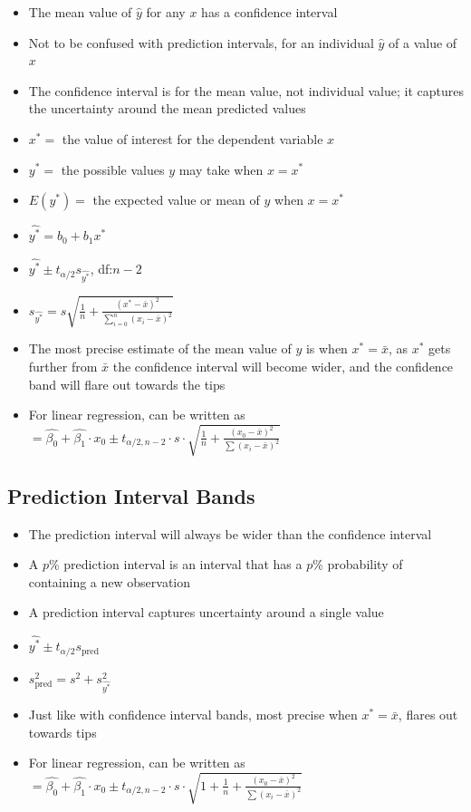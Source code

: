 \documentclass{article}
\begin{document}
\begin{itemize}
    \item The mean value of $\hat{y}$ for any $x$ has a confidence interval
    \item Not to be confused with prediction intervals, for an individual $\hat{y}$ of a value of $x$
    \item The confidence interval is for the mean value, not individual value; it captures the uncertainty around the mean predicted values
    \item $x^*=$ the value of interest for the dependent variable $x$
    \item $y^*=$ the possible values $y$ may take when $x=x^*$
    \item $E(y^*)=$ the expected value or mean of $y$ when $x=x^*$
    \item $\hat{y^*}=b_0+b_1x^*$
    \item $\hat{y^*} \pm t_{\alpha/2} s_{\hat{y^*}}$, df:$n-2$
    \item $s_{\hat{y^*}}=s \sqrt{\frac{1}{n}+\frac{(x^*-\bar{x})^2}{\sum_{i=0}^{n}(x_i-\bar{x})^2}}$
    \item The most precise estimate of the mean value of $y$ is when $x^*=\bar{x}$, as $x^*$ gets further from $\bar{x}$ the confidence interval will become wider, and the confidence band will flare out towards the tips
    \item For linear regression, can be written as $=\hat{\beta_0}+\hat{\beta_1} \cdot x_0 \pm t_{\alpha/2,n-2} \cdot s \cdot \sqrt{\frac{1}{n}+\frac{(x_0-\bar{x})^2}{\sum (x_i-\bar{x})^2}}$
\end{itemize}

\subsection{Prediction Interval Bands}

\begin{itemize}
    \item The prediction interval will always be wider than the confidence interval
    \item A $p$\% prediction interval is an interval that has a $p$\% probability of containing a new observation
    \item A prediction interval captures uncertainty around a single value
    \item $\hat{y^*} \pm t_{\alpha/2} s_{\text{pred}}$
    \item $s^2_{\text{pred}}=s^2+s^2_{\hat{y^*}}$
    \item Just like with confidence interval bands, most precise when $x^*=\bar{x}$, flares out towards tips
    \item For linear regression, can be written as $=\hat{\beta_0}+\hat{\beta_1} \cdot x_0 \pm t_{\alpha/2,n-2} \cdot s \cdot \sqrt{1+\frac{1}{n}+\frac{(x_0-\bar{x})^2}{\sum (x_i-\bar{x})^2}}$
\end{itemize}
\end{document}
